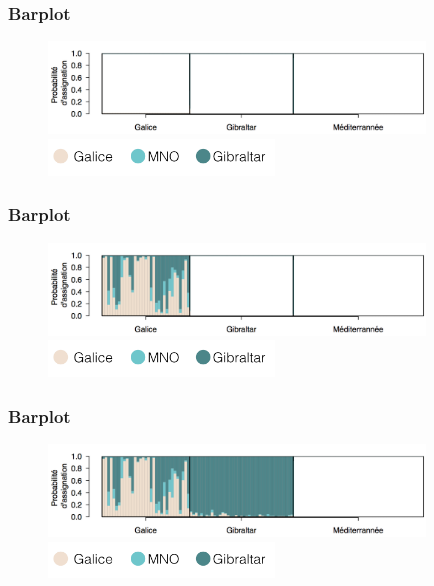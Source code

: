 \documentclass[10pt,xcolor=table]{beamer}\usepackage[]{graphicx}\usepackage[]{color}
\begin{document}
\begin{frame}
	\frametitle{Barplot}
	\begin{figure}
		\begin{center}
		\includegraphics[width=10cm]{barplotnul}\\[0.5cm]
		\includegraphics[width=6cm]{demileg}
		\end{center}
	\end{figure}
\end{frame}

\begin{frame}
	\frametitle{Barplot}
	\begin{figure}
		\begin{center}
		\includegraphics[width=10cm]{barplotgib}\\[0.5cm]
		\includegraphics[width=6cm]{demileg}
		\end{center}
	\end{figure}
\end{frame}

\begin{frame}
	\frametitle{Barplot}
	\begin{figure}
		\begin{center}
		\includegraphics[width=10cm]{barplotmno}\\[0.5cm]
		\includegraphics[width=6cm]{demileg}
		\end{center}
	\end{figure}
\end{frame}
\end{document}
